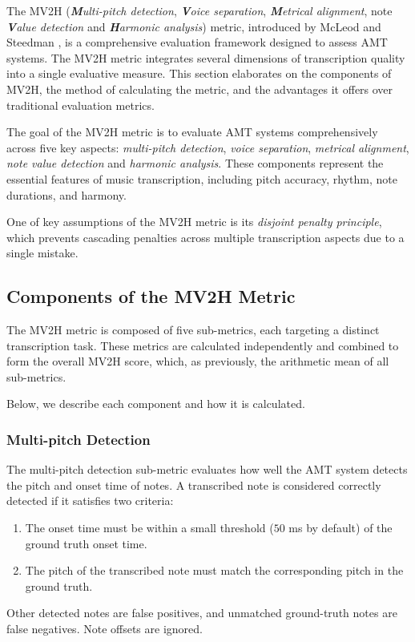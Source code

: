 The MV2H (\emph{\textbf{M}ulti-pitch detection}, \emph{\textbf{V}oice separation}, \emph{\textbf{M}etrical alignment}, note \emph{\textbf{V}alue detection} and \emph{\textbf{H}armonic analysis}) metric, introduced by McLeod and Steedman \cite{McLeod2018}, is a comprehensive evaluation framework designed to assess AMT systems. The MV2H metric integrates several dimensions of transcription quality into a single evaluative measure. This section elaborates on the components of MV2H, the method of calculating the metric, and the advantages it offers over traditional evaluation metrics.

The goal of the MV2H metric is to evaluate AMT systems comprehensively across five key aspects: \emph{multi-pitch detection}, \emph{voice separation}, \emph{metrical alignment}, \emph{note value detection} and \emph{harmonic analysis}. These components represent the essential features of music transcription, including pitch accuracy, rhythm, note durations, and harmony. 

One of key assumptions of the MV2H metric is its \emph{disjoint penalty principle}, which prevents cascading penalties across multiple transcription aspects due to a single mistake.

\subsection{Components of the MV2H Metric}

The MV2H metric is composed of five sub-metrics, each targeting a distinct transcription task. These metrics are calculated independently and combined to form the overall MV2H score, which, as previously, the arithmetic mean of all sub-metrics.

Below, we describe each component and how it is calculated.

\subsubsection{Multi-pitch Detection}

The multi-pitch detection sub-metric evaluates how well the AMT system detects the pitch and onset time of notes. A transcribed note is considered correctly detected if it satisfies two criteria: \begin{enumerate}
	\item The onset time must be within a small threshold ($50$ ms by default) of the ground truth onset time.
	\item The pitch of the transcribed note must match the corresponding pitch in the ground truth.\end{enumerate} Other detected notes are false positives, and unmatched ground-truth notes are false negatives. Note offsets are ignored.

